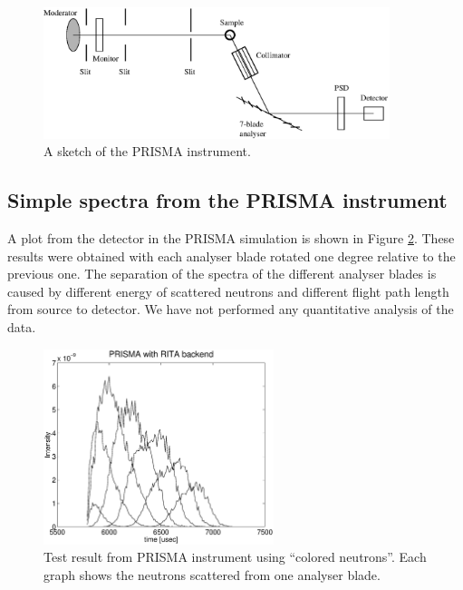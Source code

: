 \begin{figure}[h]
  \begin{center}
    \includegraphics[width=0.9\textwidth]{figures/prisma2.eps}
  \end{center}
\caption{A sketch of the PRISMA instrument.}
\label{f:PRISMA}
\end{figure}

\subsection{Simple spectra from the PRISMA instrument}
\label{data:PRISMA}

A plot from the detector in the PRISMA simulation is shown in Figure
\ref{f:PRISMAdata}. These results were obtained with each analyser blade
rotated one degree relative to the previous one. The separation of the
spectra of the different analyser blades is caused by different energy
of scattered neutrons and different flight path length from source to
detector.  We have not performed any quantitative analysis of the data.

\begin{figure}
  \begin{center}
    \includegraphics[width=0.6\textwidth]{figures/prisma2-a.eps}
  \end{center}
\caption{Test result from PRISMA instrument using ``colored
  neutrons''. Each graph shows the neutrons scattered from one analyser blade.}
\label{f:PRISMAdata}
\end{figure}
